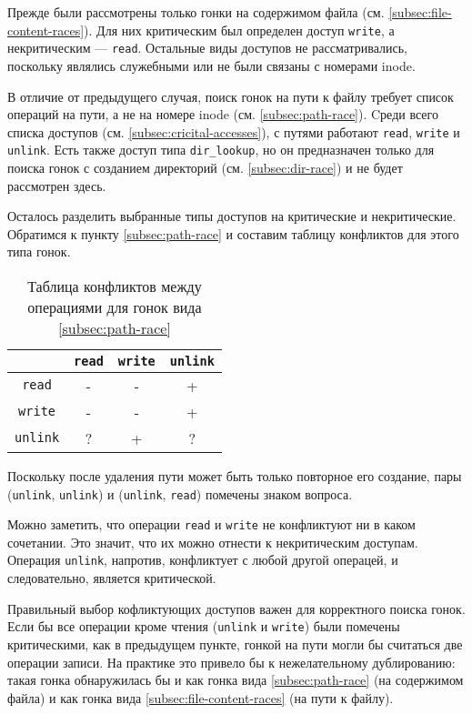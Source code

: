 Прежде были рассмотрены только гонки на содержимом файла (см. \ref{subsec:file-content-races}). Для них критическим был определен доступ \texttt{write}, а некритическим --- \texttt{read}. Остальные виды доступов не рассматривались, поскольку являлись служебными или не были связаны с номерами inode.

В отличие от предыдущего случая, поиск гонок на пути к файлу требует список операций на пути, а не на номере inode (см. \ref{subsec:path-race}). Cреди всего списка доступов (см. \ref{subsec:cricital-accesses}), с путями работают \texttt{read}, \texttt{write} и \texttt{unlink}. Есть также доступ типа \texttt{dir\_lookup}, но он предназначен только для поиска гонок с созданием директорий (см. \ref{subsec:dir-race}) и не будет рассмотрен здесь.

Осталось разделить выбранные типы доступов на критические и некритические. Обратимся к пункту \ref{subsec:path-race} и составим таблицу конфликтов для этого типа гонок.

\begin{table}[htbp]
    \centering
    \begin{tabular}{cccc}
        \toprule
        & \texttt{read} & \texttt{write} & \texttt{unlink} \\
        \midrule
        \texttt{read} & - & - & +\\
        \texttt{write} & - & - & +\\
        \texttt{unlink} & ? & + & ?\\
        \bottomrule
    \end{tabular}
    \caption{Таблица конфликтов между операциями для гонок вида \ref{subsec:path-race}}
    \label{fig:conflict-table-path-race}
\end{table}

Поскольку после удаления пути может быть только повторное его создание, пары (\texttt{unlink}, \texttt{unlink}) и (\texttt{unlink}, \texttt{read}) помечены знаком вопроса.

Можно заметить, что операции \texttt{read} и \texttt{write} не конфликтуют ни в каком сочетании. Это значит, что их можно отнести к некритическим доступам. Операция \texttt{unlink}, напротив, конфликтует с любой другой операцей, и следовательно, является критической.

Правильный выбор кофликтующих доступов важен для корректного поиска гонок. Если бы все операции кроме чтения (\texttt{unlink} и \texttt{write}) были помечены критическими, как в предыдущем пункте, гонкой на пути могли бы считаться две операции записи. На практике это привело бы к нежелательному дублированию: такая гонка обнаружилась бы и как гонка вида \ref{subsec:path-race} (на содержимом файла) и как гонка вида \ref{subsec:file-content-races} (на пути к файлу).

